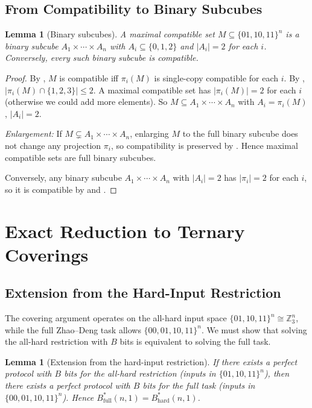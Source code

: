 \documentclass[11pt,letterpaper]{article}
\newtheorem{lemma}[theorem]{Lemma}
\newcommand{\Z}{\mathbb{Z}}
\newcommand{\Bstar}{B^{\!*}}
\begin{document}
\subsection{From Compatibility to Binary Subcubes}

\begin{lemma}[Binary subcubes]
\label{lem:subcube}
A maximal compatible set $M \subseteq \{01,10,11\}^n$ is a binary subcube $A_1 \times \cdots \times A_n$ with $A_i \subseteq \{0,1,2\}$ and $|A_i| = 2$ for each $i$. Conversely, every such binary subcube is compatible.
\end{lemma}

\begin{proof}
By , $M$ is compatible iff $\pi_i(M)$ is single-copy compatible for each $i$. By , $|\pi_i(M) \cap \{1,2,3\}| \leq 2$. A maximal compatible set has $|\pi_i(M)| = 2$ for each $i$ (otherwise we could add more elements). So $M \subseteq A_1 \times \cdots \times A_n$ with $A_i = \pi_i(M)$, $|A_i| = 2$.

\emph{Enlargement:} If $M \subsetneq A_1 \times \cdots \times A_n$, enlarging $M$ to the full binary subcube does not change any projection $\pi_i$, so compatibility is preserved by . Hence maximal compatible sets are full binary subcubes.

Conversely, any binary subcube $A_1 \times \cdots \times A_n$ with $|A_i| = 2$ has $|\pi_i| = 2$ for each $i$, so it is compatible by  and .
\end{proof}

\section{Exact Reduction to Ternary Coverings}
\label{sec:reduction}

\subsection{Extension from the Hard-Input Restriction}

The covering argument operates on the all-hard input space $\{01,10,11\}^n \cong \Z_3^n$, while the full Zhao--Deng task allows $\{00,01,10,11\}^n$. We must show that solving the all-hard restriction with $B$ bits is equivalent to solving the full task.

\begin{lemma}[Extension from the hard-input restriction]
\label{lem:extend}
If there exists a perfect protocol with $B$ bits for the all-hard restriction (inputs in $\{01,10,11\}^n$), then there exists a perfect protocol with $B$ bits for the full task (inputs in $\{00,01,10,11\}^n$). Hence $\Bstar_{\mathrm{full}}(n,1) = \Bstar_{\mathrm{hard}}(n,1)$.
\end{lemma}
\end{document}
